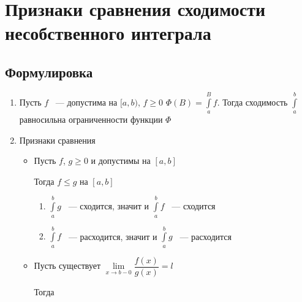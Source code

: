 \documentclass{article}
\begin{document}
    \newpage
    
    \section{Признаки сравнения сходимости несобственного интеграла}
    
        \subsection{Формулировка}
        
            \begin{enumerate}
            
                \item Пусть $f$ ~--- допустима на $[a, b)$, $f \geq 0$ $\Phi(B) = \int\limits^B_a f$. Тогда сходимость $\int\limits^b_a$ равносильна ограниченности функции $\Phi$ 
                
                \item Признаки сравнения
                
                    \begin{itemize}
                    
                        \item Пусть $f$, $g \geq 0$ и допустимы на $[a, b]$
                        
                            Тогда $f \leq g$ на $[a, b]$
                            
                            \begin{enumerate}
                            
                                \item $\int\limits^b_a g$ ~--- сходится, значит и $\int\limits^b_a f$ ~--- сходится
                                
                                \item $\int\limits^b_a f$ ~--- расходится, значит и $\int\limits^b_a g$ ~--- расходится
                                
                            \end{enumerate}
                        
                        \item Пусть существует $\lim\limits_{x \rightarrow b - 0} \dfrac{f(x)}{g(x)} = l$
                        
                            Тогда
                            

\end{itemize}
\end{enumerate}
\end{document}
